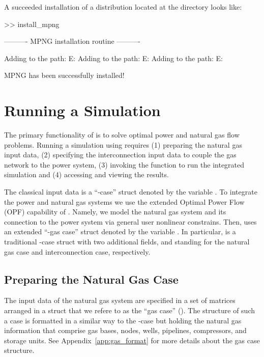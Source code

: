 \noindent A succeeded installation of a distribution located at the directory \mpnggitpath{} looks like:

\begin{Notice}
>> install_mpng

---------- MPNG installation routine ---------- 

Adding to the path: E:\GITHUB\MPNG\Functions
Adding to the path: E:\GITHUB\MPNG\Cases
Adding to the path: E:\GITHUB\MPNG\Examples

MPNG has been successfully installed!	
\end{Notice} 

\section{Running a Simulation}
\label{sec:simulate}

The primary functionality of \mpng{} is to solve optimal power and natural gas flow problems. Running a simulation using \mpng{} requires (1) preparing the natural gas input data, (2) specifying the interconnection input data to couple the gas network to the power system, (3) invoking the function to run the integrated simulation and (4) accessing and viewing the results.

The classical \matpower{} input data is a ``\matpower{}-case'' struct denoted by the variable \cite{matpower_manual}. To integrate the power and natural gas systems we use the extended Optimal Power Flow (OPF) capability of \matpower{}. Namely, we model the natural gas system and its connection to the power system via general user nonlinear constrains. Then, \mpng{} uses an extended ``\matpower{}-gas case'' struct denoted by the variable . In particular,  is a traditional \matpower{}-case struct with two additional fields,  and  standing for the natural gas case and interconnection case, respectively.

\subsection{Preparing the Natural Gas Case}
\label{subsec:gas_case}

The input data of the natural gas system are specified in a set of matrices arranged in a \matlab{} struct that we refere to as the ``gas case'' (). The structure of such a case is formatted in a similar way to the \matpower{}-case but holding the natural gas information that comprise gas bases, nodes, wells, pipelines, compressors, and storage units. See Appendix~\ref{app:gas_format} for more details about the gas case structure.

